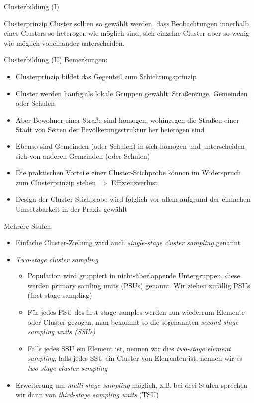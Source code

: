 \documentclass[9pt]{beamer}
\begin{document}
\begin{frame}{Clusterbildung (I)}
\begin{block}{Clusterprinzip}
Cluster sollten so gewählt werden, dass Beobachtungen innerhalb eines
Clusters so heterogen wie möglich sind, sich einzelne Cluster aber
so wenig wie möglich voneinander unterscheiden.
\end{block}
\end{frame}

\begin{frame}{Clusterbildung (II)}
Bemerkungen:
\begin{itemize}
	\item Clusterprinzip bildet das Gegenteil zum Schichtungsprinzip
	\item Cluster werden häufig als lokale Gruppen gewählt: Straßenzüge, Gemeinden oder Schulen 
	\item Aber Bewohner einer Straße sind homogen, wohingegen die Straßen einer Stadt von Seiten der Bevölkerungsstruktur her heterogen sind
	\item Ebenso sind Gemeinden (oder Schulen) in sich homogen und unterscheiden sich von anderen Gemeinden (oder Schulen)
	\item Die praktischen Vorteile einer Cluster-Stichprobe	können im Widerspruch zum Clusterprinzip stehen $\Rightarrow$ Effizienzverlust
	\item Design der Cluster-Stichprobe wird folglich vor allem aufgrund der einfachen Umsetzbarkeit in der Praxis gewählt
\end{itemize}
\end{frame}

\begin{frame}{Mehrere Stufen}
\begin{itemize}
\item Einfache Cluster-Ziehung wird auch \textit{single-stage cluster sampling} genannt
\item \textit{Two-stage cluster sampling}
\begin{itemize}
	\item Population wird gruppiert in nicht-überlappende Untergruppen, diese werden primary samling units (PSUs) genannt. Wir ziehen zufällig PSUs (first-stage sampling)	
	\item Für jedes PSU des first-stage samples werden nun wiederrum Elemente oder Cluster gezogen, man bekommt so die sogenannten \textit{second-stage sampling units (SSUs)} 
	\item Falls jedes SSU ein Element ist, nennen wir dies \textit{two-stage element sampling}, falls jedes SSU ein Cluster von Elementen ist, nennen wir es \textit{two-stage cluster sampling}
\end{itemize}
\item Erweiterung um \textit{multi-stage sampling} möglich, z.B. bei drei Stufen sprechen wir dann von \textit{third-stage sampling units} (TSU)
\end{itemize}
\end{frame}
\end{document}
